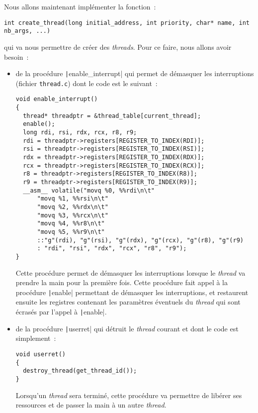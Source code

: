 \documentclass[a4paper]{article}
\begin{document}
Nous allons maintenant implémenter la fonction~:
\begin{verbatim}
int create_thread(long initial_address, int priority, char* name, int nb_args, ...)
\end{verbatim}
qui va nous permettre de créer des \emph{threads}. Pour ce faire, nous allons avoir besoin~:
\begin{itemize}
\item de la procédure \texttt|enable_interrupt| qui permet de démasquer les interruptions (fichier \verb+thread.c+) dont le code est le suivant~:
\begin{verbatim}
void enable_interrupt() 
{
  thread* threadptr = &thread_table[current_thread];
  enable();
  long rdi, rsi, rdx, rcx, r8, r9;
  rdi = threadptr->registers[REGISTER_TO_INDEX(RDI)];
  rsi = threadptr->registers[REGISTER_TO_INDEX(RSI)];
  rdx = threadptr->registers[REGISTER_TO_INDEX(RDX)];
  rcx = threadptr->registers[REGISTER_TO_INDEX(RCX)];
  r8 = threadptr->registers[REGISTER_TO_INDEX(R8)];
  r9 = threadptr->registers[REGISTER_TO_INDEX(R9)];
  __asm__ volatile("movq %0, %%rdi\n\t"
      "movq %1, %%rsi\n\t"
      "movq %2, %%rdx\n\t"
      "movq %3, %%rcx\n\t"
      "movq %4, %%r8\n\t"
      "movq %5, %%r9\n\t"
      ::"g"(rdi), "g"(rsi), "g"(rdx), "g"(rcx), "g"(r8), "g"(r9)
      : "rdi", "rsi", "rdx", "rcx", "r8", "r9");
}
\end{verbatim}
\vspace{0.4cm}
Cette procédure permet de démasquer les interruptions lorsque le \emph{thread} va prendre la main pour la première fois. Cette procédure fait appel à la procédure \texttt|enable|
permettant de démasquer les interruptions, et restaurent ensuite les registres contenant les paramètres éventuels du \emph{thread} qui sont écrasés par l'appel à \texttt|enable|.\\

\item de la procédure \texttt|userret| qui détruit le \emph{thread} courant et dont le code est simplement~:\\
\begin{verbatim}
void userret()
{
  destroy_thread(get_thread_id());
}
\end{verbatim} 
\vspace{0.4cm}
Lorsqu'un \emph{thread} sera terminé, cette procédure va permettre de libérer ses ressources et de passer la main
à un autre \emph{thread}.\\

\end{itemize}
\end{document}
